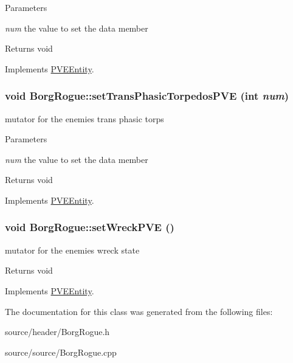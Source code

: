 \begin{DoxyParams}{Parameters}
\item[{\em num}]the value to set the data member\end{DoxyParams}
\begin{DoxyReturn}{Returns}
void 
\end{DoxyReturn}


Implements \hyperlink{classPVEEntity}{PVEEntity}.

\hypertarget{classBorgRogue_aa758dd218dae6a330f53ec54e904831b}{
\subsubsection[{setTransPhasicTorpedosPVE}]{\setlength{\rightskip}{0pt plus 5cm}void BorgRogue::setTransPhasicTorpedosPVE (int {\em num})}}
\label{db/d4f/classBorgRogue_aa758dd218dae6a330f53ec54e904831b}
mutator for the enemies trans phasic torps


\begin{DoxyParams}{Parameters}
\item[{\em num}]the value to set the data member\end{DoxyParams}
\begin{DoxyReturn}{Returns}
void 
\end{DoxyReturn}


Implements \hyperlink{classPVEEntity}{PVEEntity}.

\hypertarget{classBorgRogue_a534229bde2f85076dc13d0b5a7b7afb1}{
\subsubsection[{setWreckPVE}]{\setlength{\rightskip}{0pt plus 5cm}void BorgRogue::setWreckPVE ()}}
\label{db/d4f/classBorgRogue_a534229bde2f85076dc13d0b5a7b7afb1}
mutator for the enemies wreck state

\begin{DoxyReturn}{Returns}
void 
\end{DoxyReturn}


Implements \hyperlink{classPVEEntity}{PVEEntity}.



The documentation for this class was generated from the following files:\begin{DoxyCompactItemize}
\item 
source/header/BorgRogue.h\item 
source/source/BorgRogue.cpp\end{DoxyCompactItemize}
